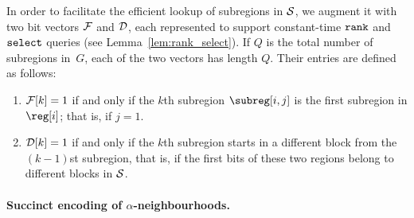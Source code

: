 {In order to facilitate the efficient lookup of subregions in $\mathcal{S}$, we augment
it with two bit vectors $\mathcal{F}$ and $\mathcal{D}$, each represented to support
constant-time $\texttt{rank}$ and $\texttt{select}$ queries (see Lemma~\ref{lem:rank_select}).
If $Q$ is the total number of subregions in~$G$, each of the two vectors has
length $Q$.
Their entries are defined as follows:
\begin{enumerate}
\item $\mathcal{F}[k] = 1$ if and only if the $k$th subregion $\subreg[i,j]$
  is the first subregion in $\reg[i]$; that is, if $j = 1$.
\item $\mathcal{D}[k] = 1$ if and only if the $k$th subregion starts in
  a different block from the $(k-1)$st subregion, that is, if
  the first bits of these two regions belong to different blocks in
  $\mathcal{S}$.
\end{enumerate}

\paragraph{\boldmath Succinct encoding of $\alpha$-neighbourhoods.}

}
